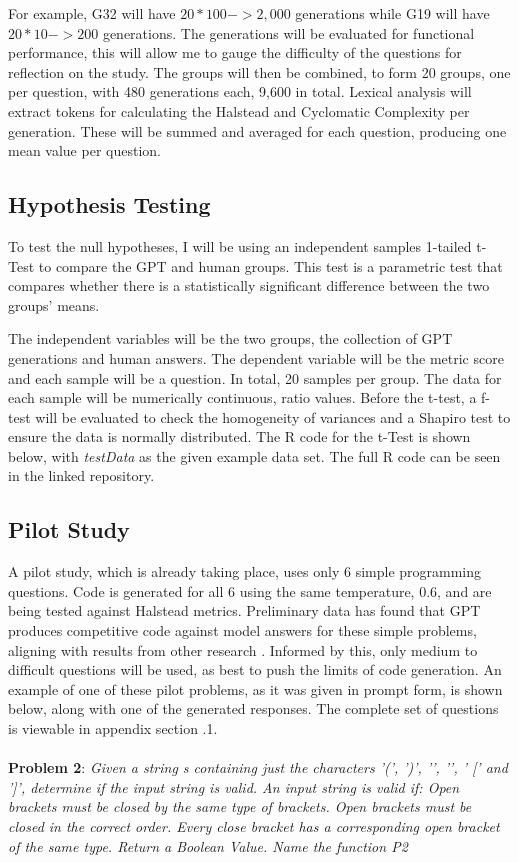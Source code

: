\documentclass[manuscript,screen,review,sigconf]{acmart}
\begin{document}
For example, G32 will have \(20 * 100 -> 2,000\) generations while G19 will have \(20 * 10 -> 200\) generations. The generations will be evaluated for functional performance, this will allow me to gauge the difficulty of the questions for reflection on the study. The groups will then be combined, to form 20 groups, one per question, with 480 generations each, 9,600 in total. Lexical analysis will extract tokens for calculating the Halstead and Cyclomatic Complexity per generation. These will be summed and averaged for each question, producing one mean value per question.

\subsection{Hypothesis Testing}
To test the null hypotheses, I will be using an independent samples 1-tailed t-Test to compare the GPT and human groups. This test is a parametric test that compares whether there is a statistically significant difference between the two groups' means.

The independent variables will be the two groups, the collection of GPT generations and human answers. The dependent variable will be the metric score and each sample will be a question. In total, 20 samples per group. The data for each sample will be numerically continuous, ratio values. Before the t-test, a f-test will be evaluated to check the homogeneity of variances and a Shapiro test to ensure the data is normally distributed. The R code for the t-Test is shown below, with \textit{testData} as the given example data set. The full R code can be seen in the linked repository.

\subsection{Pilot Study}
A pilot study, which is already taking place, uses only 6 simple programming questions. Code is generated for all 6 using the same temperature, 0.6, and are being tested against Halstead metrics. Preliminary data has found that GPT produces competitive code against model answers for these simple problems, aligning with results from other research \cite{Codex_CS1_CS2_Test}. Informed by this, only medium to difficult questions will be used, as best to push the limits of code generation. An example of one of these pilot problems, as it was given in prompt form, is shown below, along with one of the generated responses. The complete set of questions is viewable in appendix section .1.
\\ \\
\textbf{Problem 2}: \textit{Given a string s containing just the characters '(', ')', '{', '}', ' [' and ']', determine if the input string is valid. An input string is valid if: Open brackets must be closed by the same type of brackets. Open brackets must be closed in the correct order. Every close bracket has a corresponding open bracket of the same type. Return a Boolean Value. Name the function P2}
\end{document}
